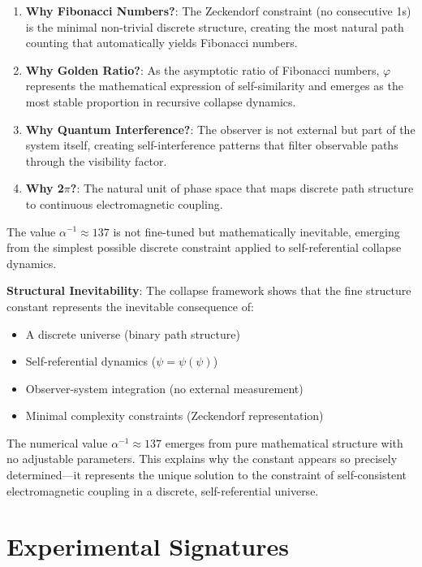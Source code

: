 \documentclass[%
 reprint,
 amsmath,amssymb,
 aps,
 prd,
 10pt,
 nofootinbib,      %
 longbibliography  %
]{revtex4-2}
\theoremstyle{definition}
\theoremstyle{remark}
\begin{document}
\begin{enumerate}
\item \textbf{Why Fibonacci Numbers?}: The Zeckendorf constraint (no consecutive 1s) is the minimal non-trivial discrete structure, creating the most natural path counting that automatically yields Fibonacci numbers.

\item \textbf{Why Golden Ratio?}: As the asymptotic ratio of Fibonacci numbers, $\varphi$ represents the mathematical expression of self-similarity and emerges as the most stable proportion in recursive collapse dynamics.

\item \textbf{Why Quantum Interference?}: The observer is not external but part of the system itself, creating self-interference patterns that filter observable paths through the visibility factor.

\item \textbf{Why 2$\pi$?}: The natural unit of phase space that maps discrete path structure to continuous electromagnetic coupling.
\end{enumerate}

The value $\alpha^{-1} \approx 137$ is not fine-tuned but mathematically inevitable, emerging from the simplest possible discrete constraint applied to self-referential collapse dynamics.

\textbf{Structural Inevitability}: The collapse framework shows that the fine structure constant represents the inevitable consequence of:
\begin{itemize}
\item A discrete universe (binary path structure)
\item Self-referential dynamics ($\psi = \psi(\psi)$)
\item Observer-system integration (no external measurement)
\item Minimal complexity constraints (Zeckendorf representation)
\end{itemize}

The numerical value $\alpha^{-1} \approx 137$ emerges from pure mathematical structure with no adjustable parameters. This explains why the constant appears so precisely determined—it represents the unique solution to the constraint of self-consistent electromagnetic coupling in a discrete, self-referential universe.

\section{Experimental Signatures}\label{sec:exp}
\end{document}
